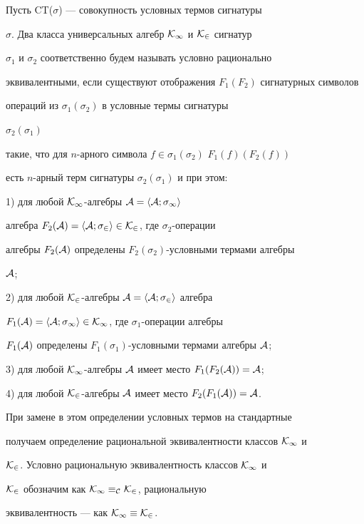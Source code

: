 Пусть CT($\sigma$) --- совокупность условных термов сигнатуры


$\sigma$. Два класса универсальных алгебр $\cal K_1$ и $\cal K_2$ сигнатур


$\sigma_1$ и $\sigma_2$ соответственно будем называть условно рационально


эквивалентными, если существуют отображения $F_1(F_2)$ сигнатурных символов


операций из $\sigma_1(\sigma_2)$ в условные термы сигнатуры


$\sigma_2(\sigma_1)$


такие, что для $n$-арного символа $f\in\sigma_1(\sigma_2)$\; $F_1(f)(F_2(f))$


есть $n$-арный терм сигнатуры $\sigma_2(\sigma_1)$ и при этом:





1) для любой $\cal K_1$-алгебры $\cal A=\langle A;\sigma_1\rangle$


алгебра $F_2(\cal A)=\langle A;\sigma_2\rangle\in\cal K_2$, где $\sigma_2$-операции


алгебры $F_2(\cal A)$ определены $F_2(\sigma_2)$-условными термами алгебры


$\cal A$;





2) для любой $\cal K_2$-алгебры $\cal A=\langle A;\sigma_2\rangle$ алгебра


$F_1(\cal A)=\langle A;\sigma_1\rangle\in\cal K_1$, где $\sigma_1$-операции алгебры


$F_1(\cal A)$ определены $F_1(\sigma_1)$-условными термами алгебры $\cal A$;





3) для любой $\cal K_1$-алгебры $\cal A$ имеет место $F_1(F_2(\cal A))=\cal A$;





4) для любой $\cal K_2$-алгебры $\cal A$ имеет место $F_2(F_1(\cal A))=\cal A$.





При замене в этом определении условных термов на стандартные


получаем определение рациональной эквивалентности классов $\cal K_1$ и


$\cal K_2$. Условно рациональную эквивалентность классов $\cal K_1$ и


$\cal K_2$ обозначим как $\cal K_1\equiv_C \cal K_2$, рациональную


эквивалентность --- как $\cal K_1\equiv \cal K_2$.





